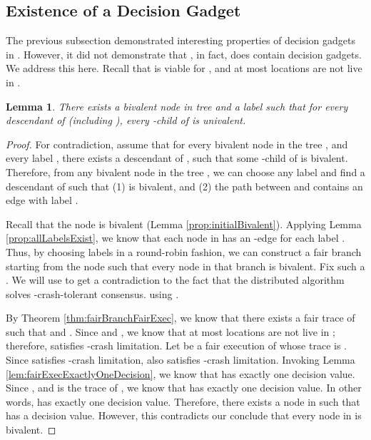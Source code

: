 \documentclass[11pt]{article}
\numberwithin{theorem}{section}
\newtheorem{lemma}[theorem]{Lemma}
\begin{document}
\subsection{Existence of a Decision Gadget} 
\label{subsubsec:existanceOfHook}
The previous subsection demonstrated interesting properties of decision gadgets in . However, it did not demonstrate that , in fact, does contain decision gadgets. We address this here.
Recall that  is viable for , and at most  locations are not live in .  
 



\begin{lemma}\label{lem:bivalentToMonovalent}
There exists a bivalent node  in tree  and a label  such that for every descendant  of  (including ), every -child of  is univalent.
\end{lemma}

\begin{proof}
 For contradiction, assume that for every bivalent node  in the tree , and every label , there exists a descendant  of , such that some -child of  is bivalent. 
Therefore, from any bivalent node  in the tree , we can choose any label  and find a descendant  of  such that (1)  is bivalent, and (2) the path between  and  contains an edge with label . 

Recall that the  node is bivalent (Lemma \ref{prop:initialBivalent}).  Applying Lemma \ref{prop:allLabelsExist}, we know that each node in  has an -edge for each label . Thus, by choosing labels in a round-robin fashion, we can construct a fair branch  starting from the  node such that every node in that branch is bivalent. Fix such a . We will use  to get a contradiction to the fact that the distributed algorithm  solves -crash-tolerant consensus. using .


By Theorem \ref{thm:fairBranchFairExec}, we know that there exists a fair trace  of  such that  and . Since  and , we know that at most  locations are not live in ; therefore,  satisfies -crash limitation. Let  be a fair execution of  whose trace is . Since  satisfies -crash limitation,  also satisfies -crash limitation. Invoking Lemma \ref{lem:fairExecExactlyOneDecision}, we know that  has exactly one decision value. Since , and  is the trace of , we know that  has exactly one decision value. In other words,  has exactly one decision value.  Therefore, there exists a node  in  such that  has a decision value. However, this contradicts our conclude that every node in  is bivalent.
\end{proof}
\end{document}
